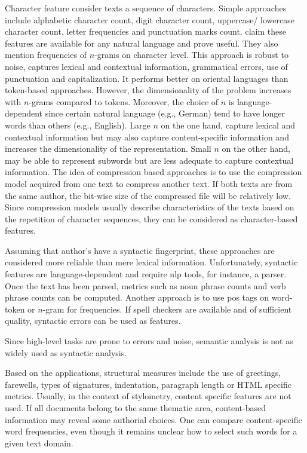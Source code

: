 Character feature consider texts a sequence of characters.
Simple approaches include alphabetic character count, digit character count, uppercase/ lowercase character count, letter frequencies and punctuation marks count.
\citet{stamatatos_survey_2009} claim these features are available for any natural language and prove useful.
They also mention frequencies of $n$-grams on character level.
This approach is robust to noise, captures lexical and contextual information, grammatical errors, use of punctuation and capitalization.
It performs better on oriental languages than token-based approaches.
However, the dimensionality of the problem increases with $n$-grams compared to tokens.
Moreover, the choice of $n$ is language-dependent since certain natural language (e.g., German) tend to have longer words than others (e.g., English).
Large $n$ on the one hand, capture lexical and contextual information but may also capture content-specific information and increases the dimensionality of the representation.
Small $n$ on the other hand, may be able to represent subwords but are less adequate to capture contextual information.
The idea of compression based approaches is to use the compression model acquired from one text to compress another text. 
If both texts are from the same author, the bit-wise size of the compressed file will be relatively low.
Since compression models usually describe characteristics of the texts based on the repetition of character sequences, 
they can be considered as character-based features. 


Assuming that author's have a syntactic fingerprint, these approaches are considered more reliable than mere lexical information.
Unfortunately, syntactic features are language-dependent and require \ac{nlp} tools, for instance, a parser.
Once the text has been parsed, metrics such as noun phrase counts and verb phrase counts can be computed.
Another approach is to use \ac{pos} tags on word-token or $n$-gram for frequencies.
If spell checkers are available and of sufficient quality, syntactic errors can be used as features.


Since high-level tasks are prone to errors and noise, semantic analysis is not as widely used as syntactic analysis.


Based on the applications, structural measures include the use of greetings, farewells, types of signatures, indentation, paragraph length 
or HTML specific metrics.
Usually, in the context of stylometry, content specific features are not used.
If all documents belong to the same thematic area, content-based information may reveal some authorial choices. 
One can compare content-specific word frequencies, even though it remains unclear how to select such words for a given text domain.

